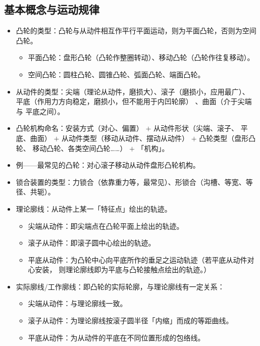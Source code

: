\documentclass[12pt,a4paper]{article}
\newcommand{\tightlist}{\setlength{\parskip}{0pt}\setlength{\itemsep}{0pt}}
\newcommand{\hint}[1]{\textsf{（#1）}}
\newcommand{\minor}[1]{{\color{gray} #1}}
\begin{document}
\subsection{基本概念与运动规律}
\begin{itemize}\tightlist
    \item 凸轮的类型：凸轮与从动件相互作平行平面运动，则为平面凸轮，否则为空间凸轮。
    \begin{itemize}\tightlist
        \item 平面凸轮：盘形凸轮\hint{凸轮作整圈转动}、移动凸轮\hint{凸轮作往复移动}。
        \item \minor{空间凸轮：圆柱凸轮、圆锥凸轮、弧面凸轮、端面凸轮。}
    \end{itemize}
    \item 从动件的类型：尖端\hint{理论从动件，磨损大}、滚子\hint{磨损小，应用最广}、
    平底\hint{作用力方向稳定，磨损小，但不能用于内凹轮廓}\minor{、曲面\hint{介于尖端与
    平底之间}}。
    \item 凸轮机构命名：安装方式\hint{对心、偏置} $+$ 从动件形状\hint{尖端、滚子、
    平底、曲面} $+$ 从动件类型\hint{移动从动件、摆动从动件} $+$ 凸轮类型\hint{盘形凸轮、
    移动凸轮、各类空间凸轮……} $+$ 「机构」。
    \item 例——最常见的凸轮：对心滚子移动从动件盘形凸轮机构。
    \item 锁合装置的类型：力锁合\hint{依靠重力等，最常见}、形锁合\hint{沟槽、等宽、等
    径、共轭}。
    \item 理论廓线：从动件上某一「特征点」绘出的轨迹。
    \begin{itemize}\tightlist
        \item 尖端从动件：即尖端点在凸轮平面上绘出的轨迹。
        \item 滚子从动件：即滚子圆中心绘出的轨迹。
        \item \minor{平底从动件：为凸轮中心向平底所作的垂足之运动轨迹\hint{若平底从动件对心安装，
        则理论廓线即为平底与凸轮接触点绘出的轨迹。}}
    \end{itemize}
    \item 实际廓线/工作廓线：即凸轮的实际轮廓，与理论廓线有一定关系：
    \begin{itemize}\tightlist
        \item 尖端从动件：与理论廓线一致。
        \item 滚子从动件：为理论廓线按滚子圆半径「内缩」而成的等距曲线。
        \item \minor{平底从动件：为从动件的平底在不同位置形成的包络线。}
    \end{itemize}

\end{itemize}
\end{document}
